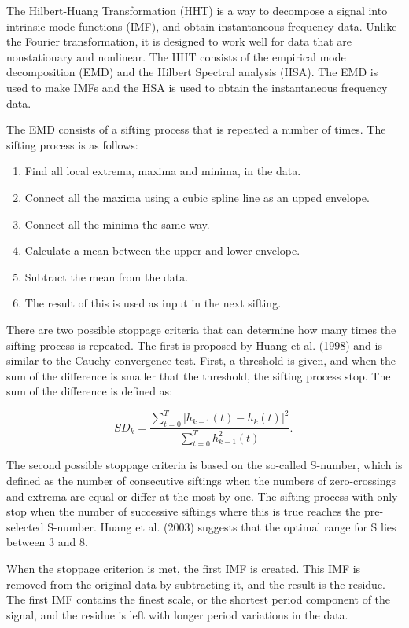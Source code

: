 \documentclass[12pt]{article}
\begin{document}
The Hilbert-Huang Transformation (HHT) is a way to decompose a signal into intrinsic mode functions (IMF), and obtain instantaneous frequency data. Unlike the Fourier transformation, it is designed to work well for data that are nonstationary and nonlinear. The HHT consists of the empirical mode decomposition (EMD) and the Hilbert Spectral analysis (HSA). The EMD is used to make IMFs and the HSA is used to obtain the instantaneous frequency data.

The EMD consists of a sifting process that is repeated a number of times. The sifting process is as follows:

\begin{enumerate}
\item Find all local extrema, maxima and minima, in the data.
\item Connect all the maxima using a cubic spline line as an upped envelope.
\item Connect all the minima the same way.
\item Calculate a mean between the upper and lower envelope.
\item Subtract the mean from the data.
\item The result of this is used as input in the next sifting.
\end{enumerate}

There are two possible stoppage criteria that can determine how many times the sifting process is repeated. The first is proposed by Huang et al. (1998) and is similar to the Cauchy convergence test. First, a threshold is given, and when the sum of the difference is smaller that the threshold, the sifting process stop. The sum of the difference is defined as: 

\begin{equation}
SD_k=\frac{\sum_{t=0}^{T}|h_{k-1}(t)-h_k(t)|^2}{\sum_{t=0}^{T} h_{k-1}^2 (t)}.\,
\end{equation}

The second possible stoppage criteria is based on the so-called S-number, which is defined as the number of consecutive siftings when the numbers of zero-crossings and extrema are equal or differ at the most by one. The sifting process with only stop when the number of successive siftings where this is true reaches the pre-selected S-number. Huang et al. (2003) suggests that the optimal range for S lies between 3 and 8. 

When the stoppage criterion is met, the first IMF is created. This IMF is removed from the original data by subtracting it, and the result is the residue. The first IMF contains the finest scale, or the shortest period component of the signal, and the residue is left with longer period variations in the data.
\end{document}
